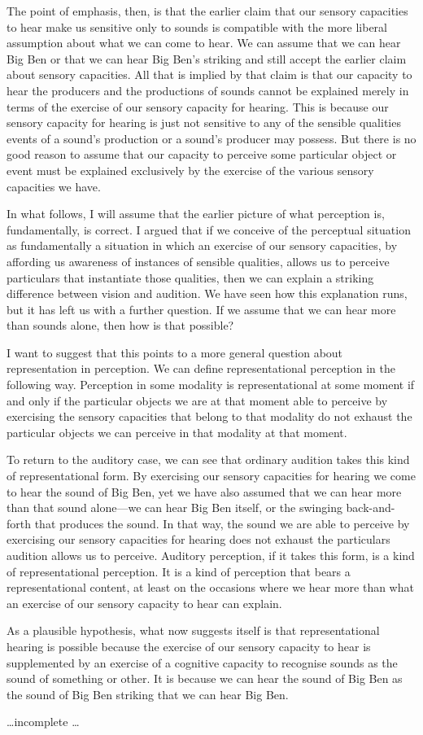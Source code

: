 \documentclass[sloppy, journal, bytitle, dodraft]{humapap}
\begin{document}
The point of emphasis, then, is that the earlier claim  that our sensory capacities to hear make us sensitive only to sounds is compatible with the more liberal assumption about what we can come to hear. We can assume that we can hear Big Ben or that we can hear Big Ben's striking and still accept the earlier claim about sensory capacities. All that is implied by that claim is that our capacity to hear the producers and the productions of sounds cannot be explained merely in terms of the exercise of our sensory capacity for hearing. This is because our sensory capacity for hearing is just not sensitive to any of the sensible qualities events of a sound's production or a sound's producer may possess. But there is no good reason to assume that our capacity to perceive some particular object or event must be explained exclusively by the exercise of the various sensory capacities we have. 

\sect In what follows, I will assume that the earlier picture of what perception is, fundamentally, is correct. I argued that if we conceive of the perceptual situation as fundamentally a situation in which an exercise of our sensory capacities, by affording us awareness of instances of sensible qualities, allows us to perceive particulars that instantiate those qualities, then we can explain a striking difference between vision and audition. We have seen how this explanation runs, but it has left us with a further question. If we assume that we can hear more than sounds alone, then how is that possible?

I want to suggest that this points to a more general question about representation in perception. We can define representational perception in the following way. Perception in some modality is representational at some moment if and only if the particular objects we are at that moment able to perceive by exercising the sensory capacities that belong to that modality do not exhaust the particular objects we can perceive in that modality at that moment.  

To return to the auditory case, we can see that ordinary audition takes this kind of representational form. By exercising our sensory capacities for hearing we come to hear the sound of Big Ben, yet we have also assumed that we can hear more than that sound alone---we can hear Big Ben itself, or the swinging back-and-forth that produces the sound. In that way, the sound we are able to perceive by exercising our sensory capacities for hearing does not exhaust the particulars audition allows us to perceive. Auditory perception, if it takes this form, is a kind of representational perception. It is a kind of perception that bears a representational content, at least on the occasions where we hear more than what an exercise of our sensory capacity to hear can explain.

As a plausible hypothesis, what now suggests itself is that representational hearing is possible because the exercise of our sensory capacity to hear is supplemented by an exercise of a cognitive capacity to recognise sounds as the sound of something or other. It is because we can hear the sound of Big Ben as the sound of Big Ben striking that we can hear Big Ben.

\ldots incomplete \ldots


\printbibliography
\end{document}
